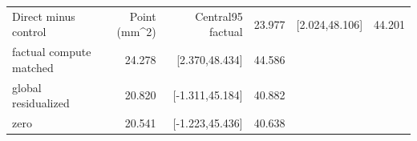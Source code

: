 \begin{tabular}{lrrr}
\toprule
Direct minus control & Point (mm^2) & Central95%
\midrule
factual & 23.977 & [2.024,48.106] & 44.201\\
factual compute matched & 24.278 & [2.370,48.434] & 44.586\\
global residualized & 20.820 & [-1.311,45.184] & 40.882\\
zero & 20.541 & [-1.223,45.436] & 40.638\\
\bottomrule
\end{tabular}
